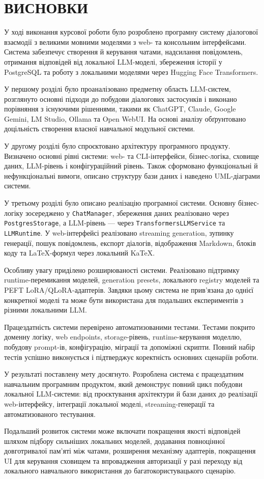 \section*{ВИСНОВКИ}

У ході виконання курсової роботи було розроблено програмну систему діалогової взаємодії з великими мовними моделями з web- та консольним інтерфейсами. Система забезпечує створення й керування чатами, надсилання повідомлень, отримання відповідей від локальної LLM-моделі, збереження історії у PostgreSQL та роботу з локальними моделями через Hugging Face Transformers.

У першому розділі було проаналізовано предметну область LLM-систем, розглянуто основні підходи до побудови діалогових застосунків і виконано порівняння з існуючими рішеннями, такими як ChatGPT, Claude, Google Gemini, LM Studio, Ollama та Open WebUI. На основі аналізу обґрунтовано доцільність створення власної навчальної модульної системи.

У другому розділі було спроєктовано архітектуру програмного продукту. Визначено основні рівні системи: web- та CLI-інтерфейси, бізнес-логіка, сховище даних, LLM-рівень і конфігураційний рівень. Також сформовано функціональні й нефункціональні вимоги, описано структуру бази даних і наведено UML-діаграми системи.

У третьому розділі було описано реалізацію програмної системи. Основну бізнес-логіку зосереджено у \texttt{ChatManager}, збереження даних реалізовано через \texttt{PostgresStorage}, а LLM-рівень --- через \texttt{TransformersLLMService} та \texttt{LLMRuntime}. У web-інтерфейсі реалізовано streaming generation, зупинку генерації, пошук повідомлень, експорт діалогів, відображення Markdown, блоків коду та LaTeX-формул через локальний KaTeX.

Особливу увагу приділено розширюваності системи. Реалізовано підтримку runtime-перемикання моделей, generation presets, локального registry моделей та PEFT LoRA/QLoRA-адаптерів. Завдяки цьому система не прив'язана до однієї конкретної моделі та може бути використана для подальших експериментів з різними локальними LLM.

Працездатність системи перевірено автоматизованими тестами. Тестами покрито доменну логіку, web endpoints, storage-рівень, runtime-керування моделлю, побудову prompt-ів, конфігурацію, міграції та допоміжні скрипти. Повний набір тестів успішно виконується і підтверджує коректність основних сценаріїв роботи.

У результаті поставлену мету досягнуто. Розроблена система є працездатним навчальним програмним продуктом, який демонструє повний цикл побудови локальної LLM-системи: від проєктування архітектури й бази даних до реалізації web-інтерфейсу, інтеграції локальної моделі, streaming-генерації та автоматизованого тестування.

Подальший розвиток системи може включати покращення якості відповідей шляхом підбору сильніших локальних моделей, додавання повноцінної довготривалої пам'яті між чатами, розширення механізму адаптерів, покращення UI для керування сховищем та впровадження авторизації у разі переходу від локального навчального використання до багатокористувацького сценарію.

\newpage
